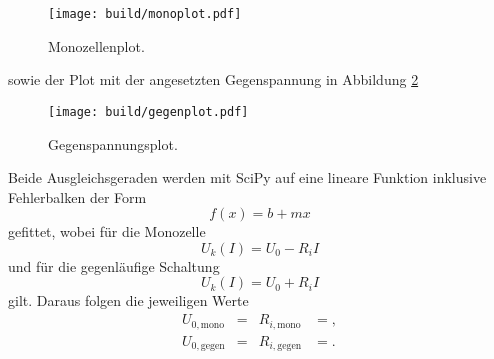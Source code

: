 \begin{figure}[H]
  \centering
  \texttt{[image: build/monoplot.pdf]}
  \caption{Monozellenplot.}
  \label{fig:1}
\end{figure}

sowie der Plot mit der angesetzten Gegenspannung in Abbildung \ref{fig:2}

\begin{figure}[H]
  \centering
  \texttt{[image: build/gegenplot.pdf]}
  \caption{Gegenspannungsplot.}
  \label{fig:2}
\end{figure}

Beide Ausgleichsgeraden werden mit SciPy auf eine lineare Funktion inklusive Fehlerbalken der Form
\begin{equation}
  f(x) = b + mx
  \label{eqn:mxb}
\end{equation}
gefittet, wobei für die Monozelle
\begin{equation}
  U_k(I) = U_0 - R_iI
    \label{eqn:uk}
\end{equation}
und für die gegenläufige Schaltung
\begin{equation}
  U_k(I) = U_0 + R_iI
\end{equation}
gilt.
Daraus folgen die jeweiligen Werte
\begin{align*}
  U_{0,{\text{mono}}}  &=   & R_{i,\text{mono}}  &= ,\\
  U_{0,{\text{gegen}}} &=  & R_{i,\text{gegen}} &= .
\end{align*}

